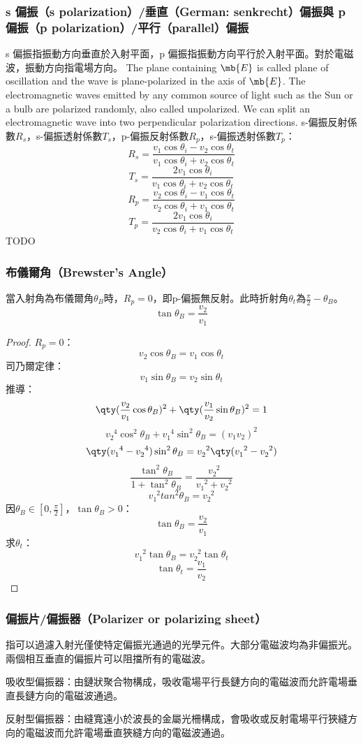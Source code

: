 \documentclass[a4paper,12pt]{report}
\begin{document}
\subsubsection{s 偏振（s polarization）/垂直（German: senkrecht）偏振與 p 偏振（p polarization）/平行（parallel）偏振}
s 偏振指振動方向垂直於入射平面，p 偏振指振動方向平行於入射平面。對於電磁波，振動方向指電場方向。
The plane containing $\mb{E}$ is called plane of oscillation and the wave is plane-polarized in the axis of $\mb{E}$. The electromagnetic waves emitted by any common source of light such as the Sun or a bulb are polarized randomly, also called unpolarized. We can split an electromagnetic wave into two perpendicular polarization directions.
s-偏振反射係數$R_s$，s-偏振透射係數$T_s$，p-偏振反射係數$R_p$，s-偏振透射係數$T_p$：
\[ R_s = \frac{v_1 \cos \theta_i - v_2 \cos \theta_t}{v_1 \cos \theta_i + v_2 \cos \theta_t} \]
\[ T_s = \frac{2 v_1 \cos \theta_i}{v_1 \cos \theta_i + v_2 \cos \theta_t} \]
\[ R_p = \frac{v_2 \cos \theta_i - v_1 \cos \theta_t}{v_2 \cos \theta_i + v_1 \cos \theta_t} \]
\[ T_p = \frac{2 v_1 \cos \theta_i}{v_2 \cos \theta_i + v_1 \cos \theta_t} \]
\bpr
TODO
\epr
\subsubsection{布儀爾角（Brewster's Angle）}
當入射角為布儀爾角$\theta_B$時，$R_p=0$，即p-偏振無反射。此時折射角$\theta_t$為$\frac{\pi}{2}-\theta_B$。
\[ \tan \theta_B = \frac{v_2}{v_1} \]
\begin{proof}
$R_p=0$：
\[ v_2\cos\theta_B=v_1\cos\theta_t \]
司乃爾定律：
\[ v_1\sin\theta_B=v_2\sin\theta_t \]
推導：
\[\qty(\frac{v_2}{v_1}\cos\theta_B)^2+\qty(\frac{v_1}{v_2}\sin\theta_B)^2=1\]
\[v_2^{\phantom{2}4}\cos^2\theta_B+v_1^{\phantom{1}4}\sin^2\theta_B=(v_1v_2)^2\]
\[\qty(v_1^{\phantom{1}4}-v_2^{\phantom{2}4})\sin^2\theta_B =v_2^{\phantom{2}2}\qty(v_1^{\phantom{1}2}-v_2^{\phantom{2}2})\]
\[\frac{\tan^2\theta_B }{1+\tan^2\theta_B }=\frac{v_2^{\phantom{2}2}}{v_1^{\phantom{1}2}+v_2^{\phantom{2}2}}\]
\[v_1^{\phantom{1}2}tan^2\theta_B =v_2^{\phantom{2}2}\]
因$\theta_B\in [0,\frac{\pi}{2}]$，$\tan\theta_B >0$：
\[ \tan \theta_B = \frac{v_2}{v_1} \]
求$\theta_t$：
\[ v_1^{\phantom{1}2}\tan\theta_B=v_2^{\phantom{2}2}\tan\theta_t \]
\[ \tan \theta_t = \frac{v_1}{v_2} \]
\end{proof}
\subsubsection{偏振片/偏振器（Polarizer or polarizing sheet）}
指可以過濾入射光僅使特定偏振光通過的光學元件。大部分電磁波均為非偏振光。兩個相互垂直的偏振片可以阻擋所有的電磁波。
\bit
\item 吸收型偏振器：由鏈狀聚合物構成，吸收電場平行長鏈方向的電磁波而允許電場垂直長鏈方向的電磁波通過。
\item 反射型偏振器：由縫寬遠小於波長的金屬光柵構成，會吸收或反射電場平行狹縫方向的電磁波而允許電場垂直狹縫方向的電磁波通過。
\eit
\end{document}
